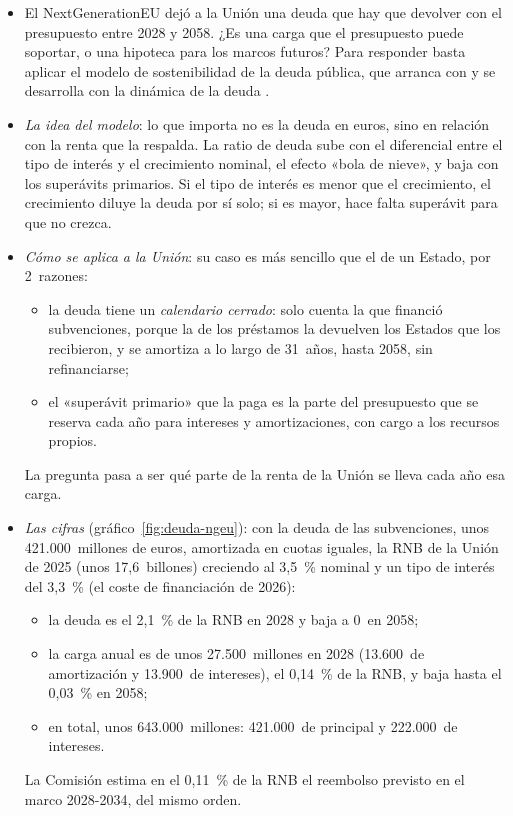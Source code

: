 \documentclass[11pt]{article}
\begin{document}
\begin{itemize}
\item El NextGenerationEU dejó a la Unión una deuda que hay que devolver con el presupuesto entre 2028 y 2058. ¿Es una carga que el presupuesto puede soportar, o una hipoteca para los marcos futuros? Para responder basta aplicar el modelo de sostenibilidad de la deuda pública, que arranca con \textcite{Domar1944Burden} y se desarrolla con la dinámica de la deuda .
\item \emph{La idea del modelo}: lo que importa no es la deuda en euros, sino en relación con la renta que la respalda. La ratio de deuda sube con el diferencial entre el tipo de interés y el crecimiento nominal, el efecto «bola de nieve», y baja con los superávits primarios. Si el tipo de interés es menor que el crecimiento, el crecimiento diluye la deuda por sí solo; si es mayor, hace falta superávit para que no crezca.
\item \emph{Cómo se aplica a la Unión}: su caso es más sencillo que el de un Estado, por 2~razones:
  \begin{itemize}
  \item la deuda tiene un \emph{calendario cerrado}: solo cuenta la que financió subvenciones, porque la de los préstamos la devuelven los Estados que los recibieron, y se amortiza a lo largo de 31~años, hasta 2058, sin refinanciarse;
  \item el «superávit primario» que la paga es la parte del presupuesto que se reserva cada año para intereses y amortizaciones, con cargo a los recursos propios.
  \end{itemize}
  La pregunta pasa a ser qué parte de la renta de la Unión se lleva cada año esa carga.
\item \emph{Las cifras} (gráfico~\ref{fig:deuda-ngeu}): con la deuda de las subvenciones, unos 421.000~millones de euros, amortizada en cuotas iguales, la RNB de la Unión de 2025 (unos 17,6~billones) creciendo al 3,5~\% nominal y un tipo de interés del 3,3~\% (el coste de financiación de 2026):
  \begin{itemize}
  \item la deuda es el 2,1~\% de la RNB en 2028 y baja a 0~en 2058;
  \item la carga anual es de unos 27.500~millones en 2028 (13.600~de amortización y 13.900~de intereses), el 0,14~\% de la RNB, y baja hasta el 0,03~\% en 2058;
  \item en total, unos 643.000~millones: 421.000~de principal y 222.000~de intereses.
  \end{itemize}
  La Comisión estima en el 0,11~\% de la RNB el reembolso previsto en el marco 2028-2034, del mismo orden.
\end{itemize}
\end{document}
